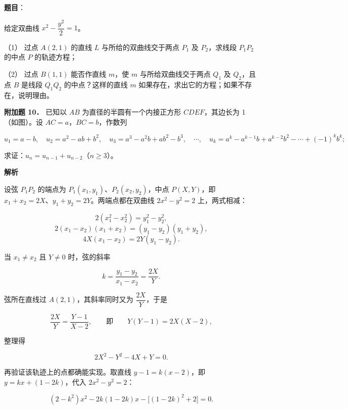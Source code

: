\begin{answer}

\textbf{题目}：

给定双曲线 $x^2-\dfrac{y^2}{2}=1$。

（1） 过点 $A(2,1)$ 的直线 $L$ 与所给的双曲线交于两点 $P_1$ 及 $P_2$，求线段 $P_1P_2$ 的中点 $P$ 的轨迹方程；

（2） 过点 $B(1,1)$ 能否作直线 $m$，使 $m$ 与所给双曲线交于两点 $Q_1$ 及 $Q_2$，且点 $B$ 是线段 $Q_1Q_2$ 的中点？这样的直线 $m$ 如果存在，求出它的方程；如果不存在，说明理由。

\textbf{附加题 10．} 已知以 $AB$ 为直径的半圆有一个内接正方形 $CDEF$，其边长为 1（如图）。设 $AC=a$，$BC=b$，作数列

\nopagebreak[4]
\[
u_1=a-b,\quad u_2=a^2-ab+b^2,\quad u_3=a^3-a^2b+ab^2-b^3,\quad\cdots,\quad
u_k=a^k-a^{k-1}b+a^{k-2}b^2-\cdots+(-1)^k b^k;
\]

求证：$u_n=u_{n-1}+u_{n-2}$（$n\geqslant 3$）。
\nopagebreak[4]
\begin{center}\end{center}
\nopagebreak[4]
\textbf{解析}

设弦 $P_1P_2$ 的端点为 $P_1(x_1,y_1)$、$P_2(x_2,y_2)$，中点 $P(X,Y)$，即 $x_1+x_2=2X$、$y_1+y_2=2Y$。两端点都在双曲线 $2x^2-y^2=2$ 上，两式相减：

\nopagebreak[4]
\[
2(x_1^2-x_2^2)=y_1^2-y_2^2,
\]
\nopagebreak[4]
\[
2(x_1-x_2)(x_1+x_2)=(y_1-y_2)(y_1+y_2),
\]
\nopagebreak[4]
\[
4X(x_1-x_2)=2Y(y_1-y_2).
\]

当 $x_1\ne x_2$ 且 $Y\ne0$ 时，弦的斜率

\nopagebreak[4]
\[
k=\frac{y_1-y_2}{x_1-x_2}=\frac{2X}{Y}.
\]


弦所在直线过 $A(2,1)$，其斜率同时又为 $\dfrac{2X}{Y}$，于是

\nopagebreak[4]
\[
\frac{2X}{Y}=\frac{Y-1}{X-2},
\qquad\text{即}\qquad
Y(Y-1)=2X(X-2),
\]

整理得

\nopagebreak[4]
\[
2X^2-Y^2-4X+Y=0.
\]

再验证该轨迹上的点都确能实现。取直线 $y-1=k(x-2)$，即 $y=kx+(1-2k)$，代入 $2x^2-y^2=2$：

\nopagebreak[4]
\[
(2-k^2)x^2-2k(1-2k)x-\bigl[(1-2k)^2+2\bigr]=0.
\]


\end{answer}
